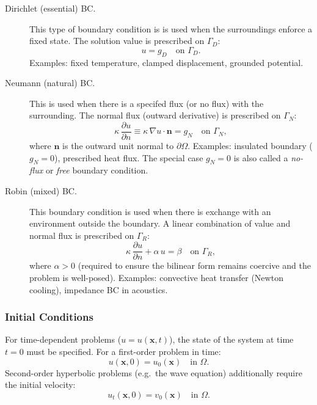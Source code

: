 \documentclass[11pt]{article}
\newcommand{\domain}{\Omega}
\newcommand{\boundary}{\partial\Omega}
\begin{document}
\begin{description}
  \item[Dirichlet (essential) BC.]
    This type of boundary condition is is used when the surroundings enforce a fixed state.
    The solution value is prescribed on $\Gamma_D$:
    \begin{equation*}
      u = g_D \quad \text{on } \Gamma_D.
    \end{equation*}
    Examples: fixed temperature, clamped displacement, grounded potential.

  \item[Neumann (natural) BC.]
    This is used when there is a specifed flux (or no flux) with the surrounding.
    The normal flux (outward derivative) is prescribed on $\Gamma_N$:
    \begin{equation*}
      \kappa\,\frac{\partial u}{\partial n}
        \equiv \kappa\,\nabla u\cdot\mathbf{n} = g_N
        \quad \text{on } \Gamma_N,
    \end{equation*}
    where $\mathbf{n}$ is the outward unit normal to $\boundary$.
    Examples: insulated boundary ($g_N = 0$), prescribed heat flux.
    The special case $g_N = 0$ is also called a \emph{no-flux} or
    \emph{free} boundary condition.

  \item[Robin (mixed) BC.]
    This boundary condition is used when there is exchange with an environment outside the boundary.
    A linear combination of value and normal flux is prescribed on
    $\Gamma_R$:
    \begin{equation*}
      \kappa\,\frac{\partial u}{\partial n} + \alpha\,u = \beta
      \quad \text{on } \Gamma_R,
    \end{equation*}
    where $\alpha > 0$ (required to ensure the bilinear form remains
    coercive and the problem is well-posed).
    Examples: convective heat transfer (Newton cooling), impedance BC in
    acoustics.
\end{description}

\subsubsection{Initial Conditions}

For time-dependent problems ($u = u(\mathbf{x},t)$), the state of the
system at time $t=0$ must be specified.
For a first-order problem in time:
\begin{equation*}
  u(\mathbf{x}, 0) = u_0(\mathbf{x}) \quad \text{in } \domain.
\end{equation*}
Second-order hyperbolic problems (e.g.\ the wave equation) additionally
require the initial velocity:
\begin{equation*}
  u_t(\mathbf{x}, 0) = v_0(\mathbf{x}) \quad \text{in } \domain.
\end{equation*}
\end{document}
